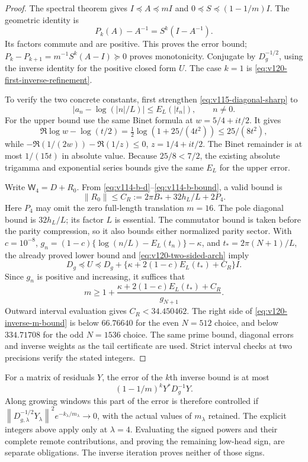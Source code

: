 \documentclass[11pt]{article}
\theoremstyle{remark}
\newcommand{\norm}[1]{\left\lVert #1\right\rVert}
\begin{document}
\begin{proof}
The spectral theorem gives $I\preceq A\preceq mI$ and
$0\preceq S\preceq(1-1/m)I$. The geometric identity is
\[
 P_k(A)-A^{-1}=S^k(I-A^{-1}).
\]
Its factors commute and are positive. This proves the error bound;
$P_k-P_{k+1}=m^{-1}S^k(A-I)\succeq0$ proves monotonicity.
Conjugate by $D_g^{-1/2}$, using the inverse identity for the
positive closed form $U$. The case $k=1$ is
\eqref{eq:v120-first-inverse-refinement}.

To verify the two concrete constants, first strengthen
\eqref{eq:v115-diagonal-sharp} to
\begin{equation}\label{eq:v120-two-sided-arch}
 |a_n-\log(|n|/L)|\le E_L(|t_n|),\qquad n\ne0.
\end{equation}
For the upper bound use the same Binet formula at
$w=5/4+it/2$. It gives
\[
 \Re\log w-\log(t/2)
 =\tfrac12\log(1+25/(4t^2))\le25/(8t^2),
\]
while $-\Re(1/(2w))-\Re(1/z)\le0$, $z=1/4+it/2$.
The Binet remainder is at most $1/(15t)$ in absolute value.
Because $25/8<7/2$, the existing absolute trigamma and exponential
series bounds give the same $E_L$ for the upper error.

Write $\mathsf W_4=D+R_0$. From
\eqref{eq:v114-b-d}--\eqref{eq:v114-b-bound}, a valid bound is
\[
 \norm{R_0}\le C_R:=2\pi B_*+32h_L/L+2P_4.
\]
Here $P_4$ may omit the zero full-length translation $m=16$.
The pole diagonal bound is $32h_L/L$; its factor $L$ is essential.
The commutator bound is taken before the parity compression, so it
also bounds either normalized parity sector. With $c=10^{-8}$,
$g_n=(1-c)\{\log(n/L)-E_L(t_n)\}-\kappa$, and
$t_*=2\pi(N+1)/L$, the already proved lower bound and
\eqref{eq:v120-two-sided-arch} imply
\[
 D_g\preceq U\preceq
 D_g+\{\kappa+2(1-c)E_L(t_*)+C_R\}I.
\]
Since $g_n$ is positive and increasing, it suffices that
\begin{equation}\label{eq:v120-inverse-m-bound}
 m\ge1+\frac{\kappa+2(1-c)E_L(t_*)+C_R}{g_{N+1}}.
\end{equation}
Outward interval evaluation gives $C_R<34.450462$. The right side
of \eqref{eq:v120-inverse-m-bound} is below $66.76640$ for the
even $N=512$ choice, and below $334.71708$ for the odd $N=1536$
choice. The same prime bound, diagonal errors and inverse weights
as the tail certificate are used. Strict interval checks at two
precisions verify the stated integers.
\end{proof}

For a matrix of residuals $Y$, the error of the $k$th inverse bound
is at most
\[
 (1-1/m)^k Y^*D_g^{-1}Y.
\]
Along growing windows this part of the error is therefore controlled
if $\norm{D_{g,\lambda}^{-1/2}Y_\lambda}^2
 e^{-k_\lambda/m_\lambda}\to0$, with the actual values of
$m_\lambda$ retained. The explicit integers above apply only at
$\lambda=4$. Evaluating the signed powers and their complete remote
contributions, and proving the remaining low-head sign, are separate
obligations. The inverse iteration proves neither of those signs.
\end{document}
